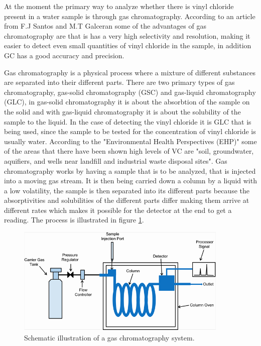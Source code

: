 \documentclass{article}
\begin{document}
At the moment the primary way to analyze whether there is vinyl chloride present in a water sample is through gas chromatography.
According to an article from F.J Santos and M.T Galceran some of the advantages of gas chromatography are that is has a very high selectivity and resolution, making it easier to detect even small quantities of vinyl chloride in the sample, in addition GC has a good accuracy and precision.\cite{SANTOS2002672}


Gas chromatography is a physical process where a mixture of different substances are separated into their different parts.\cite{waters_1978_gc}
There are two primary types of gas chromatography, gas-solid chromatography (GSC) and gas-liquid chromatography (GLC), in gas-solid chromatography it is about the absorbtion of the sample on the solid and with gas-liquid chromatography it is about the solubility of the sample to the liquid. \cite{ambrose_1963_gc}
In the case of detecting the vinyl chloride it is GLC that is being used, since the sample to be tested for the concentration of vinyl chloride is usually water.
According to the "Environmental Health Perspectives (EHP)" some of the areas that there have been shown high levels of VC are "soil, groundwater, aquifiers, and wells near landfill and industrial waste disposal sites"\cite{vc_kielhorn_2000}.
Gas chromatography works by having a sample that is to be analyzed, that is injected into a moving gas stream.
It is then being carried down a column by a liquid with a low volatility, the sample is then separated into its different parts because the absorptivities and solubilities of the different parts differ making them arrive at different rates which makes it possible for the detector at the end to get a reading.\cite{ambrose_1963_gc}
The process is illustrated in figure \ref{fig:glc_illustration}.

\begin{figure}[H]
    \centering
    \includegraphics[width=0.9\textwidth]{glc_illustration.png}
    \caption{Schematic illustration of a gas chromatography system. \cite{glc_illustration}}
    \label{fig:glc_illustration}
\end{figure}
\end{document}

